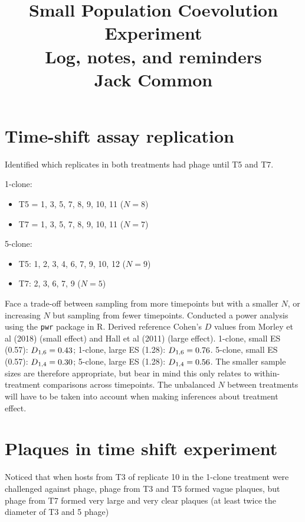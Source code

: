 \documentclass [12pt, a4paper, twoside]  {article}
\title{
	\raggedright
	\Huge{\textbf{Small Population Coevolution Experiment}}\\
	\Large{Log, notes, and reminders}\\
	\Large{Jack Common}\\
	\vspace{.5cm}
}
\date{\vspace{-12ex}}
\newcommand{\sub}{\textsubscript}
\begin{document}
\maketitle

\section*{Time-shift assay replication}
Identified which replicates in both treatments had phage until T5 and T7. 

1-clone:
\begin{itemize}
	\item T5 = 1, 3, 5, 7, 8, 9, 10, 11 ($N=8$)
	\item T7 = 1, 3, 5, 7, 8, 9, 10, 11 ($N=7$)
\end{itemize}

5-clone:
\begin{itemize}
	\item T5: 1, 2, 3, 4, 6, 7, 9, 10, 12 ($N=9$)
	\item T7: 2, 3, 6, 7, 9 ($N=5$)
\end{itemize}

Face a trade-off between sampling from more timepoints but with a smaller $N$, or increasing $N$ but sampling from fewer timepoints. Conducted a power analysis using the \texttt{pwr} package in R. Derived reference Cohen's $D$ values from Morley et al (2018) (small effect) and Hall et al (2011) (large effect). 1-clone, small ES (0.57): $D\sub{1,6}=0.43$; 1-clone, large ES (1.28): $D\sub{1,6}=0.76$. 5-clone, small ES (0.57): $D\sub{1,4}=0.30$; 5-clone, large ES (1.28): $D\sub{1,4}=0.56$.
The smaller sample sizes are therefore appropriate, but bear in mind this only relates to within-treatment comparisons across timepoints. The unbalanced $N$ between treatments will have to be taken into account when making inferences about treatment effect. 

\section*{Plaques in time shift experiment}
Noticed that when hosts from T3 of replicate 10 in the 1-clone treatment were challenged against phage, phage from T3 and T5 formed vague plaques, but phage from T7 formed very large and very clear plaques (at least twice the diameter of T3 and 5 phage)
\end{document}
